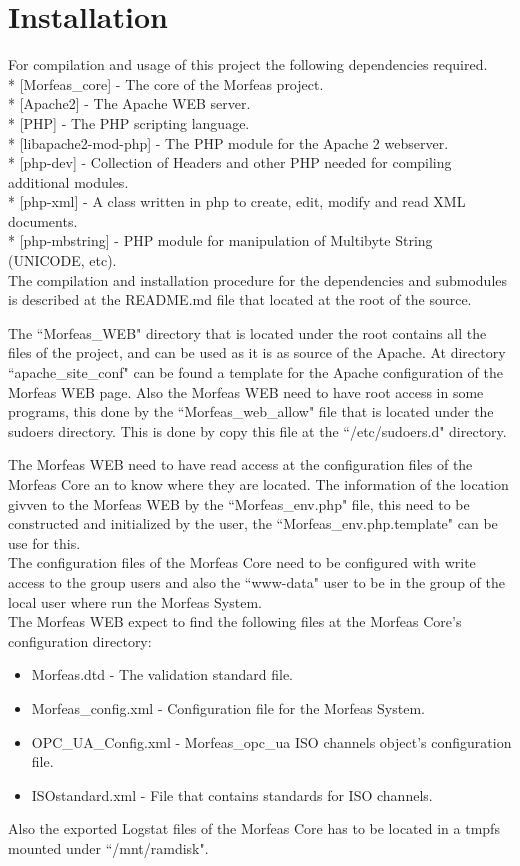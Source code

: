 \section{Installation}
For compilation and usage of this project the following dependencies required.\\
* [Morfeas\_core] - The core of the Morfeas project.\\
* [Apache2] - The Apache WEB server.\\
* [PHP] - The PHP scripting language.\\
* [libapache2-mod-php] - The PHP module for the Apache 2 webserver.\\
* [php-dev] - Collection of Headers and other PHP needed for compiling additional modules.\\
* [php-xml] -  A class written in php to create, edit, modify and read XML documents.\\
* [php-mbstring] - PHP module for manipulation of Multibyte String (UNICODE, etc).\\

The compilation and installation procedure for the dependencies and submodules is described at the README.md file that located at the root of the source.

The ``Morfeas\_WEB" directory that is located under the root contains all the files of the project, and can be used as it is as source of the Apache.
At directory ``apache\_site\_conf" can be found a template for the Apache configuration of the Morfeas WEB page.
Also the Morfeas WEB need to have root access in some programs, this done by the ``Morfeas\_web\_allow" file that is located under the sudoers directory.
This is done by copy this file at the ``/etc/sudoers.d" directory.

The Morfeas WEB need to have read access at the configuration files of the Morfeas Core an to know where they are located. The information of the location givven to the
Morfeas WEB by the ``Morfeas\_env.php" file, this need to be constructed and initialized by the user, the ``Morfeas\_env.php.template" can be use for this.\\
The configuration files of the Morfeas Core need to be configured with write access to the group users
and also the ``www-data" user to be in the group of the local user where run the Morfeas System.\\
The Morfeas WEB expect to find the following files at the Morfeas Core's configuration directory:
\begin{itemize}
	\item Morfeas.dtd - The validation standard file.
	\item Morfeas\_config.xml - Configuration file for the Morfeas System.
	\item OPC\_UA\_Config.xml - Morfeas\_opc\_ua ISO channels object's configuration file.
	\item ISOstandard.xml - File that contains standards for ISO channels.
\end{itemize}
Also the exported Logstat files of the Morfeas Core has to be located in a tmpfs mounted under ``/mnt/ramdisk".